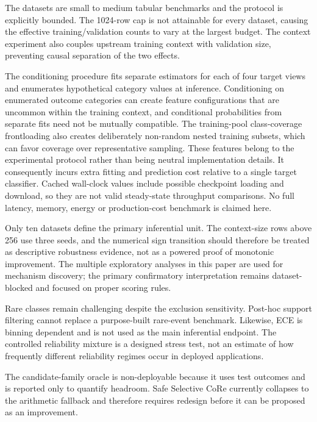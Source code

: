 \documentclass[a4paper,fleqn]{cas-sc}
\begin{document}
The datasets are small to medium tabular benchmarks and the protocol is explicitly bounded. The 1024-row cap is not attainable for every dataset, causing the effective training/validation counts to vary at the largest budget. The context experiment also couples upstream training context with validation size, preventing causal separation of the two effects.

The conditioning procedure fits separate estimators for each of four target views and enumerates hypothetical category values at inference. Conditioning on enumerated outcome categories can create feature configurations that are uncommon within the training context, and conditional probabilities from separate fits need not be mutually compatible. The training-pool class-coverage frontloading also creates deliberately non-random nested training subsets, which can favor coverage over representative sampling. These features belong to the experimental protocol rather than being neutral implementation details. It consequently incurs extra fitting and prediction cost relative to a single target classifier. Cached wall-clock values include possible checkpoint loading and download, so they are not valid steady-state throughput comparisons. No full latency, memory, energy or production-cost benchmark is claimed here.

Only ten datasets define the primary inferential unit. The context-size rows above 256 use three seeds, and the numerical sign transition should therefore be treated as descriptive robustness evidence, not as a powered proof of monotonic improvement. The multiple exploratory analyses in this paper are used for mechanism discovery; the primary confirmatory interpretation remains dataset-blocked and focused on proper scoring rules.

Rare classes remain challenging despite the exclusion sensitivity. Post-hoc support filtering cannot replace a purpose-built rare-event benchmark. Likewise, ECE is binning dependent and is not used as the main inferential endpoint. The controlled reliability mixture is a designed stress test, not an estimate of how frequently different reliability regimes occur in deployed applications.

The candidate-family oracle is non-deployable because it uses test outcomes and is reported only to quantify headroom. Safe Selective CoRe currently collapses to the arithmetic fallback and therefore requires redesign before it can be proposed as an improvement.
\end{document}
